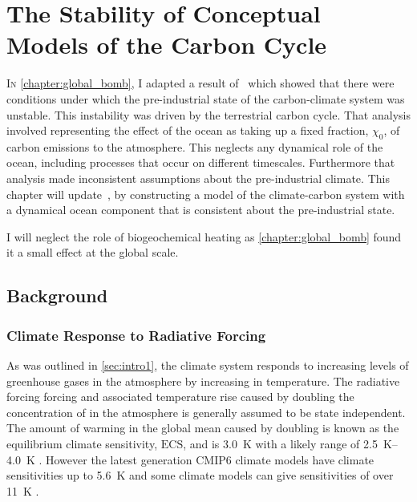 \chapter{The Stability of Conceptual Models of the Carbon Cycle}
\label{chapter:conceptual_carbon_cycle}
\graphicspath{{box_ocean/figs/}}

\lettrine[lines=3,loversize=0.1,findent=0.1em,nindent=0em]{I}{n} \cref{chapter:global_bomb}, I adapted a result of~\cite{Cox2006}
which showed that there were conditions under which the pre-industrial state of the carbon-climate
system was unstable. This instability was driven by the terrestrial carbon cycle. That analysis involved representing the effect of the ocean as taking up a fixed fraction,
$\chi_0$, of carbon emissions to the atmosphere. This neglects any dynamical role of the ocean, including processes that occur on different timescales. Furthermore that analysis
made inconsistent assumptions about the pre-industrial climate. This chapter will update~\cite{Cox2006}, by constructing a model of the climate-carbon system with a dynamical ocean component
that is consistent about the pre-industrial state.

I will neglect the role of biogeochemical heating as \cref{chapter:global_bomb} found it a small effect at the global scale.

\section{Background}

\subsection{Climate Response to Radiative Forcing}
As was outlined in \cref{sec:intro1}, the climate system responds to increasing levels of greenhouse gases in the atmosphere by increasing in temperature. The radiative forcing
forcing and associated temperature rise caused by doubling the concentration of  in the atmosphere is generally assumed to be state independent. The amount of warming
in the global mean caused by doubling  is known as the equilibrium climate sensitivity, $\mathrm{ECS}$, and is
\SI{3.0}{\kelvin} with a likely range of \SIrange{2.5}{4.0}{\kelvin} \parencite{AR6,Sherwood2020}.
However the latest generation CMIP6 climate models have climate sensitivities up to \SI{5.6}{\kelvin} \parencite{Zelinka2020} and some climate models can give sensitivities of over
\SI{11}{\kelvin} \parencite{Stainforth2005}.

